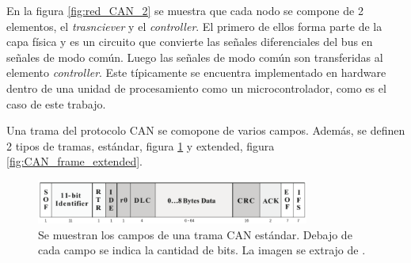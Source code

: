 En la figura \ref{fig:red_CAN_2} se muestra que cada nodo se compone de 2 elementos, el \textit{trasnciever} y el \textit{controller}. El primero de ellos forma parte de la capa física y es un circuito que convierte las señales diferenciales del bus en señales de modo común. Luego las señales de modo común son transferidas al elemento \textit{controller}. Este típicamente se encuentra implementado en hardware dentro de una unidad de procesamiento como un microcontrolador, como es el caso de este trabajo.



Una trama del protocolo CAN se comopone de varios campos. Además, se definen 2 tipos de tramas, estándar, figura \ref{fig:CAN_frame_standard} y extended, figura \ref{fig:CAN_frame_extended}.

\begin{figure}[H]
    \centering
    \includegraphics[width=0.8\textwidth]{img/CAN_frame_standard.png}
    \caption{Se muestran los campos de una trama CAN estándar. Debajo de cada campo se indica la cantidad de bits. La imagen se extrajo de \cite{texasSLOA101B}.}
    \label{fig:CAN_frame_standard}
\end{figure}

